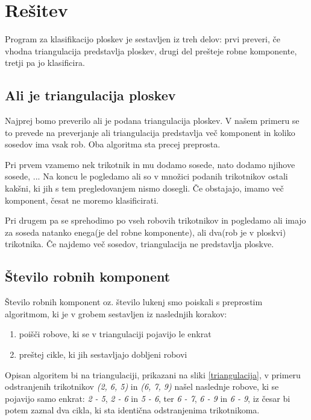 \documentclass{article}
\begin{document}
\section{Rešitev}
Program za klasifikacijo ploskev je sestavljen iz treh delov: prvi preveri, če vhodna triangulacija predstavlja ploskev, drugi del prešteje robne komponente, tretji pa jo klasificira.
\subsection{Ali je triangulacija ploskev}
Najprej bomo preverilo ali je podana triangulacija ploskev. V našem primeru se to prevede na preverjanje ali triangulacija predstavlja več komponent in koliko sosedov ima vsak rob. Oba algoritma sta precej preprosta. 

Pri prvem vzamemo nek trikotnik in mu dodamo sosede, nato dodamo njihove sosede, ... Na koncu le pogledamo ali so v množici podanih trikotnikov ostali kakšni, ki jih s tem pregledovanjem nismo dosegli. Če obstajajo, imamo več komponent, česat ne moremo klasificirati.

Pri drugem pa se sprehodimo po vseh robovih trikotnikov in pogledamo ali imajo za soseda natanko enega(je del robne komponente), ali dva(rob je v ploskvi) trikotnika. Če najdemo več sosedov, triangulacija ne predstavlja ploskve.

\subsection{Število robnih komponent}
Število robnih komponent oz. število lukenj smo poiskali s preprostim algoritmom, ki je v grobem sestavljen iz naslednjih korakov:
\begin{enumerate}
\item poišči robove, ki se v triangulaciji pojavijo le enkrat
\item preštej cikle, ki jih sestavljajo dobljeni robovi
\end{enumerate}
Opisan algoritem bi na triangulaciji, prikazani na sliki \ref{triangulacija}, v primeru odstranjenih trikotnikov \textit{(2, 6, 5)} in \textit{(6, 7, 9)} našel naslednje robove, ki se pojavijo samo enkrat: \textit{2 - 5}, \textit{2 - 6} in \textit{5 - 6}, ter \textit{6 - 7}, \textit{6 - 9} in \textit{6 - 9}, iz česar bi potem zaznal dva cikla, ki sta identična odstranjenima trikotnikoma.
\end{document}
